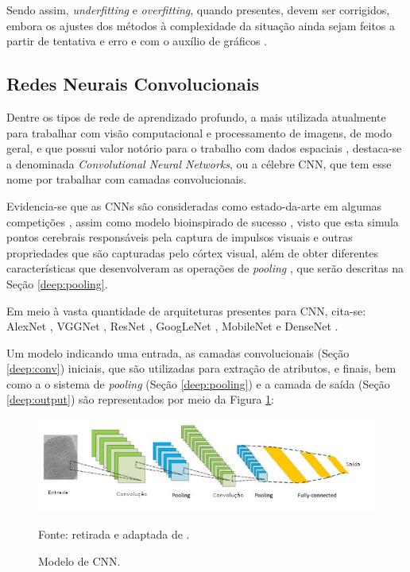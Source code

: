 Sendo assim, \textit{underfitting} e \textit{overfitting}, quando presentes, devem ser corrigidos, embora os ajustes dos métodos à complexidade da situação ainda sejam feitos a partir de tentativa e erro e com o auxílio de gráficos \cite{Goodfellow2016}.


\subsection{Redes Neurais Convolucionais}
\label{deep:CNN}

Dentre os tipos de rede de aprendizado profundo, a mais utilizada atualmente para trabalhar com visão computacional e processamento de imagens, de modo geral, e que possui valor notório para o trabalho com dados espaciais \cite{Goodfellow2016, ponti2018funciona, Ghosh2019}, destaca-se a denominada \textit{Convolutional Neural Networks}\cite{LeCun1999}, ou a célebre CNN, que tem esse nome por trabalhar com camadas convolucionais.

Evidencia-se que as CNNs são consideradas como estado-da-arte em algumas competições \cite{Parkhi2015}, assim como modelo bioinspirado de sucesso \cite{Goodfellow2016}, visto que esta simula pontos cerebrais responsáveis pela captura de impulsos visuais e outras propriedades que são capturadas pelo córtex visual, além de obter diferentes características que desenvolveram as operações de \textit{pooling} \cite{Goodfellow2016}, que serão descritas na Seção \ref{deep:pooling}.

Em meio à vasta quantidade de arquiteturas presentes para CNN, cita-se: AlexNet \cite{krizhevsky2012imagenet}, VGGNet \cite{Simonyan2015}, ResNet \cite{He2016}, GoogLeNet \cite{Szegedy2015}, MobileNet \cite{Howard2017} e DenseNet \cite{Huang2017}.

Um modelo indicando uma entrada, as camadas convolucionais (Seção \ref{deep:conv}) iniciais, que são utilizadas para extração de atributos, e finais, bem como a o sistema de \textit{pooling} (Seção \ref{deep:pooling}) e a camada de saída (Seção \ref{deep:output}) são representados por meio da Figura \ref{deep:fig:10}:

\begin{figure}[H]
    \centering
    \caption{Modelo de CNN.}
    \includegraphics[width=1\linewidth]{recursos/imagens/deep/cnn.jpg}
    \label{deep:fig:10}

    \vspace*{1 cm}
    Fonte: retirada e adaptada de \cite{Minaee2021DeepClassification}.
\end{figure}

